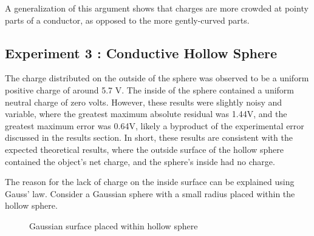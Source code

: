 A generalization of this argument shows that charges are more crowded at pointy parts of
a conductor, as opposed to the more gently-curved parts.


\newpage

\subsection{Experiment 3 : Conductive Hollow Sphere}

The charge distributed on the outside of the sphere was observed to be a uniform positive charge of around 5.7 V. The inside of the sphere contained a uniform neutral charge of zero volts. However, these results were slightly noisy and variable, where the greatest maximum absolute residual was 1.44V, and the greatest maximum error was 0.64V, likely a byproduct of the experimental error discussed in the results section. In short, these results are consistent with the expected theoretical results, where the outside surface of the hollow sphere contained the object's net charge, and the sphere's inside had no charge.

The reason for the lack of charge on the inside surface can be explained using Gauss' law. Consider a Gaussian sphere with a small radius placed within the hollow sphere. 

\begin{figure}[h]
    \centering
    \caption{Gaussian surface placed within hollow sphere}
    \label{fig:gaussiansurface}
\end{figure}


